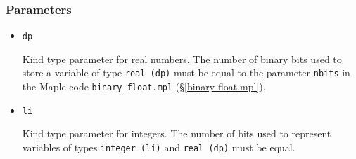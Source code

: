 \documentclass[paper=a4,smallheadings]{scrartcl}
\begin{document}
\subsubsection*{Parameters}
\begin{itemize}
\item \texttt{dp} \par
Kind type parameter for real numbers.  The number of binary
bits used to store a variable of type \texttt{real (dp)} must be equal
to the parameter \texttt{nbits} in the Maple code
\texttt{binary\_float.mpl} (\S\ref{binary-float.mpl}).
%
\item \texttt{li} \par
Kind type parameter for integers. The number of bits used to represent
variables of types \texttt{integer (li)} and \texttt{real (dp)} must
be equal.
\end{itemize}
%
\end{document}
